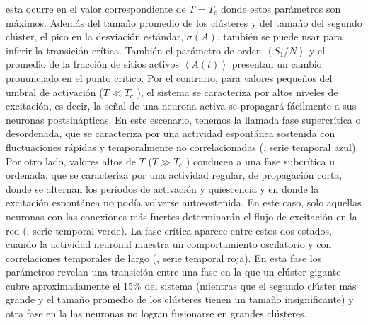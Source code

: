 esta ocurre en el valor correspondiente de $T=T_c$ donde estos parámetros  son máximos.   Además  del tamaño promedio de los clústeres y del tamaño del segundo clúster, el pico en la desviación estándar, $\sigma(A)$, también se puede usar para inferir la transición crítica.   También el parámetro de orden   $\left\langle S_1/N \right\rangle $ y el promedio de la fracción de sitios activos $ \left\langle A(t) \right\rangle$     presentan  un cambio pronunciado en el punto critico.   Por el contrario, para valores pequeños del umbral de activación ($T \ll T_c$ ), el sistema se caracteriza por altos niveles de excitación, es decir, la señal de una neurona  activa se propagará fácilmente a sus neuronas postsinápticas. En este escenario, tenemos la llamada fase supercrítica o desordenada, que se caracteriza por una actividad espontánea sostenida con fluctuaciones rápidas y temporalmente no correlacionadas (, serie temporal azul).  Por otro lado, valores altos de $T$ ($T \gg T_c$ ) conducen a una fase subcrítica u ordenada, que se caracteriza por una actividad regular, de propagación corta,  donde se alternan los períodos de activación y quiescencia y en donde la excitación espontánea no podía volverse autosostenida. En este caso, solo aquellas neuronas con las conexiones más fuertes determinarán el flujo de excitación en la red (, serie temporal verde).  La fase crítica aparece entre estos dos estados, cuando la actividad neuronal muestra un comportamiento oscilatorio y con correlaciones temporales de largo (, serie temporal roja).  En esta fase los parámetros  revelan una transición  entre una fase en la que un clúster gigante cubre aproximadamente el 15\% del sistema (mientras que el segundo clúster más grande y el tamaño promedio de los clústeres tienen un tamaño insignificante)  y otra fase en la las neuronas no logran fusionarse en grandes clústeres.    


